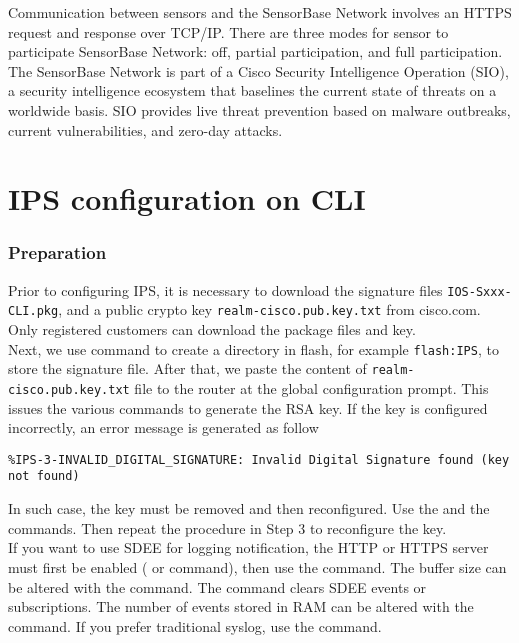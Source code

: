 Communication between sensors and the SensorBase Network involves an HTTPS request and response over TCP/IP. There are three modes for sensor to participate SensorBase Network: off, partial participation, and full participation.\\

The SensorBase Network is part of a Cisco Security Intelligence Operation (SIO), a security intelligence ecosystem that baselines the current state of threats on a worldwide basis. SIO provides live threat prevention based on malware outbreaks, current vulnerabilities, and zero-day attacks.


\section{IPS configuration on CLI}

\subsubsection{Preparation}

Prior to configuring IPS, it is necessary to download the signature files \verb|IOS-Sxxx-CLI.pkg|, and a public crypto key \verb|realm-cisco.pub.key.txt| from cisco.com. Only registered customers can download the package files and key.\\

Next, we use  command to create a directory in flash, for example \verb|flash:IPS|, to store the signature file. After that, we paste the content of \verb|realm-cisco.pub.key.txt| file to the router at the global configuration prompt. This issues the various commands to generate the RSA key. If the key is configured incorrectly, an error message is generated as follow

\begin{verbatim}
%IPS-3-INVALID_DIGITAL_SIGNATURE: Invalid Digital Signature found (key not found)
\end{verbatim}

In such case, the key must be removed and then reconfigured. Use the  and the  commands. Then repeat the procedure in Step 3 to reconfigure the key.\\

If you want to use SDEE for logging notification, the HTTP or HTTPS server must first be enabled ( or  command), then use the  command. The buffer size can be altered with the  command. The  command clears SDEE events or subscriptions. The number of events stored in RAM can be altered with the  command. If you prefer traditional syslog, use the  command.\\

